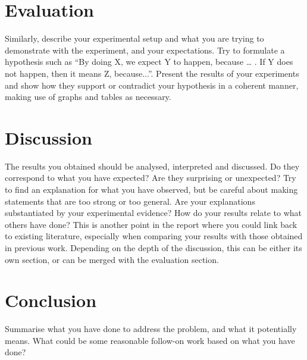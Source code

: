 \documentclass[11pt]{article}
\begin{document}
\section{Evaluation}
Similarly, describe your experimental setup and what you are trying to demonstrate with the experiment, and your expectations. Try to formulate a hypothesis such as ``By doing X, we expect Y to happen, because … . If Y does not happen, then it means Z, because...''. Present the results of your experiments and show how they support or contradict your hypothesis in a coherent manner, making use of graphs and tables as necessary. 

\section{Discussion}
The results you obtained should be analysed, interpreted and discussed. Do they correspond to what you have expected? Are they surprising or unexpected? Try to find an explanation for what you have observed, but be careful about making statements that are too strong or too general. Are your explanations substantiated by your experimental evidence? How do your results relate to what others have done? This is another point in the report where you could link back to existing literature, especially when comparing your results with those obtained in previous work. Depending on the depth of the discussion, this can be either its own section, or can be merged with the evaluation section.

\section{Conclusion}
Summarise what you have done to address the problem, and what it potentially means. What could be some reasonable follow-on work based on what you have done? 



\end{document}
